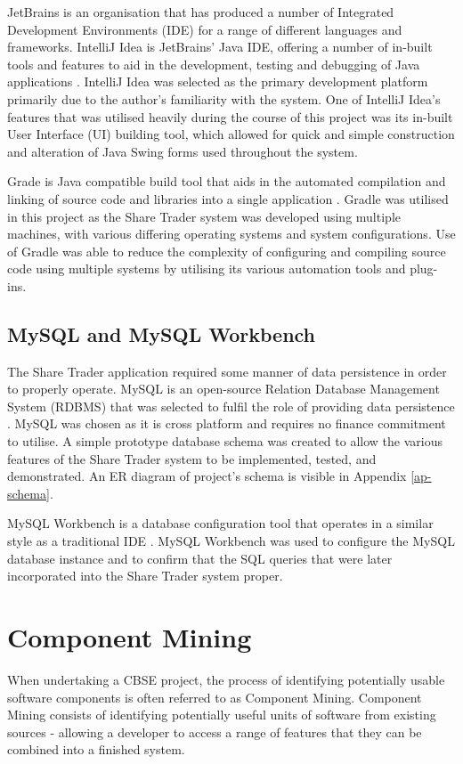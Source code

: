 \documentclass[12pt, a4paper,titlepage]{article}
\begin{document}
JetBrains is an organisation that has produced a number of Integrated
Development Environments (IDE) for a range of different languages and
frameworks.
IntelliJ Idea is JetBrains' Java IDE, offering a number of in-built tools and
features to aid in the development, testing and debugging of Java
applications \cite{Idea}.
IntelliJ Idea was selected as the primary development platform primarily due to
the author's familiarity with the system.
One of IntelliJ Idea's features that was utilised heavily during the course
of this project was its in-built User Interface (UI) building tool, which
allowed for quick and simple construction and alteration of Java Swing forms
used throughout the system.

Grade is Java compatible build tool that aids in the automated compilation
and linking of source code and libraries into a single application
\cite{Gradle}.
Gradle was utilised in this project as the Share Trader system was developed
using multiple machines, with various differing operating systems and system
configurations.
Use of Gradle was able to reduce the complexity of configuring and compiling
source code using multiple systems by utilising its various automation tools and
plug-ins.

\subsection{MySQL and MySQL Workbench}
The Share Trader application required some manner of data persistence in order
to properly operate.
MySQL is an open-source Relation Database Management System (RDBMS) that was
selected to fulfil the role of providing data persistence \cite{Mysql}.
MySQL was chosen as it is cross platform and requires no finance commitment
to utilise.
A simple prototype database schema was created to allow the various features
of the Share Trader system to be implemented, tested, and demonstrated.
An ER diagram of project's schema is visible in Appendix \ref{ap-schema}.

MySQL Workbench is a database configuration tool that operates in a similar
style as a traditional IDE \cite{Workbench}.
MySQL Workbench was used to configure the MySQL database instance and to
confirm that the SQL queries that were later incorporated into the Share
Trader system proper.


\section{Component Mining}
When undertaking a CBSE project, the process of identifying potentially usable
software components is often referred to as Component Mining.  
Component Mining consists of identifying potentially useful units of software
from existing sources - allowing a developer to access a range of features
that they can be combined into a finished system.
\end{document}
